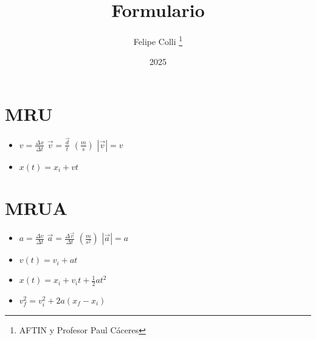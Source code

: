 \documentclass[11pt]{article}
\title{Formulario}
\author{Felipe Colli \thanks{AFTIN y Profesor Paul Cáceres}}
\date{2025}
\begin{document}
\maketitle


\section{MRU}
    \begin{itemize}
        \item $v=\frac{\Delta{x}}{\Delta{t}}$ $\vec{v}=\frac{\vec{d}}{t}$ $(\frac{m}{s})$ $|\vec{v}|=v$ 
        \item $x(t)=x_i+vt $
    \end{itemize}

\section{MRUA}
    \begin{itemize}
        \item $a=\frac{\Delta{v}}{\Delta{t}}$ $\vec{a}=\frac{\Delta{\vec{v}}}{\Delta{t}}$ $(\frac{m}{s^2})$ $|\vec{a}|=a$
        \item $v(t)=v_i+at$
        \item $x(t)=x_i+v_it+\frac{1}{2}at^2$
        \item $v_f^2=v_i^2+2a(x_f-x_i)$
    \end{itemize}
\end{document}
